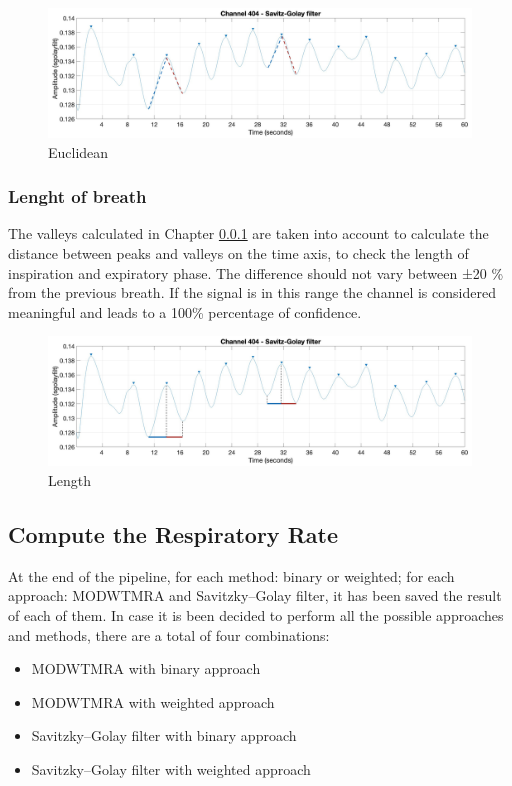 \begin{figure}[H]
    \centering
    \includegraphics[width=\textwidth]{img/euclidian.png}
    \caption{Euclidean}
    \label{fig:Euclidean}
\end{figure}

\subsubsection{Lenght of breath} \label{cap:BrethLength}
The valleys calculated in Chapter \ref{cap:BrethLength} are taken into account to calculate the distance between peaks and valleys on the time axis, to check the length of inspiration and expiratory phase. The difference should not vary between ±20 \% from the previous breath. If the signal is in this range the channel is considered meaningful and leads to a 100\% percentage of confidence.\\
\vspace*{0.5cm}

\begin{figure}[H]
    \centering
    \includegraphics[width=\textwidth]{img/x_axis.png}
    \caption{Length}
    \label{fig:lenght}
\end{figure}
\vspace*{0.3cm}

\subsection{Compute the Respiratory Rate} \label{cap:computeRespiratory}

At the end of the pipeline, for each method: binary or weighted; for each approach: MODWTMRA and Savitzky–Golay filter, it has been saved the result of each of them. In case it is been decided to perform all the possible approaches and methods, there are a total of four combinations:
\begin{itemize}
    \item MODWTMRA with binary approach
    \item MODWTMRA with weighted approach
    \item Savitzky–Golay filter with binary approach
    \item Savitzky–Golay filter with weighted approach   
\end{itemize}

